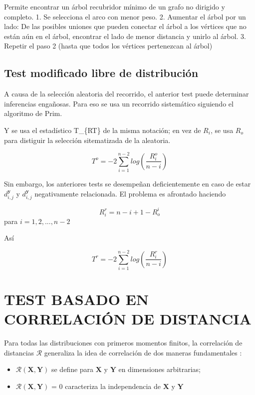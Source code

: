 \documentclass[]{book}
\providecommand{\tightlist}{%
  \setlength{\itemsep}{0pt}\setlength{\parskip}{0pt}}
\begin{document}
Permite encontrar un árbol recubridor mínimo de un grafo no dirigido y
completo. 1. Se selecciona el arco con menor peso. 2. Aumentar el árbol
por un lado: De las posibles uniones que pueden conectar el árbol a los
vértices que no están aún en el árbol, encontrar el lado de menor
distancia y unirlo al árbol. 3. Repetir el paso 2 (hasta que todos los
vértices pertenezcan al árbol) \citep{heller2012consistent}

\section{Test modificado libre de
distribución}\label{test-modificado-libre-de-distribucion}

A causa de la selección aleatoria del recorrido, el anterior test puede
determinar inferencias engañosas. Para eso se usa un recorrido
sistemático siguiendo el algoritmo de Prim. \citep{heller2012consistent}

Y se usa el estadístico T\_\{RT\} de la misma notación; en vez de
\(R_i\), se usa \(R_o\) para distiguir la selección sitematizada de la
aleatoria.

\[T^{o} = -2 \displaystyle \sum_{i=1}^{n-2} log \left( \dfrac{R_i^o}{n-i}\right)\]

Sin embargo, los anteriores tests se desempeñan deficientemente en caso
de estar \(d_{i,j}^{\mathbf{y}}\) y \(d_{i,j}^{\mathbf{y}}\)
negativamente relacionada. El problema es afrontado haciendo

\[R_i^{r} = n-i+1- R_o^i\] para \(i= 1, 2, ... , n-2\)

Así

\[ T^{r} = -2 \displaystyle \sum_{i=1}^{n-2} log \left( \dfrac{R_i ^r}{n-i}\right)\]

\chapter{TEST BASADO EN CORRELACIÓN DE
DISTANCIA}\label{test-basado-en-correlacion-de-distancia}

Para todas las distribuciones con primeros momentos finitos, la
correlación de distancias \(\mathcal{R}\) generaliza la idea de
correlación de dos maneras fundamentales \citep{szekely2007measuring}:

\begin{itemize}
\tightlist
\item
  \(\mathcal{R} \mathbf{(X, Y)}\) se define para \(\mathbf{X}\) y
  \(\mathbf{Y}\) en dimensiones arbitrarias;
\item
  \(\mathcal{R} \mathbf{(X, Y)}\) = 0 caracteriza la independencia de
  \(\mathbf{X}\) y \(\mathbf{Y}\)
\end{itemize}
\end{document}
